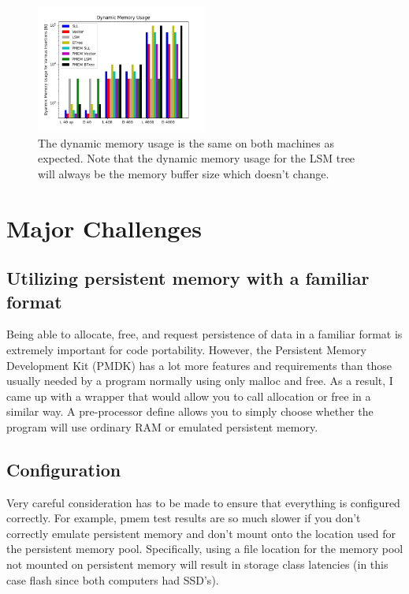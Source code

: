 \documentclass[twocolumn]{article}
\begin{document}
\begin{figure}[H]
  \centering
  \includegraphics[width=0.5\textwidth]{memory_usage}
  \caption{The dynamic memory usage is the same on both machines as expected.
  Note that the dynamic memory usage for the LSM tree will always be the memory
buffer size which doesn't change.}
\end{figure}

\section{Major Challenges}

\subsection{Utilizing persistent memory with a familiar format}

Being able to allocate, free, and request persistence of data in a familiar
format is extremely important for code portability. However, the Persistent
Memory Development Kit (PMDK) has a lot more features and requirements than
those usually needed by a program normally using only malloc and free. As a
result, I came up with a wrapper that would allow you to call allocation or free
in a similar way. A pre-processor define allows you to simply choose whether the
program will use ordinary RAM or emulated persistent memory.

\subsection{Configuration}

Very careful consideration has to be made to ensure that everything is
configured correctly. For example, pmem test results are so much slower if you
don't correctly emulate persistent memory and don't mount onto the location used
for the persistent memory pool. Specifically, using a file location for the
memory pool not mounted on persistent memory will result in storage class
latencies (in this case flash since both computers had SSD's).
\end{document}
